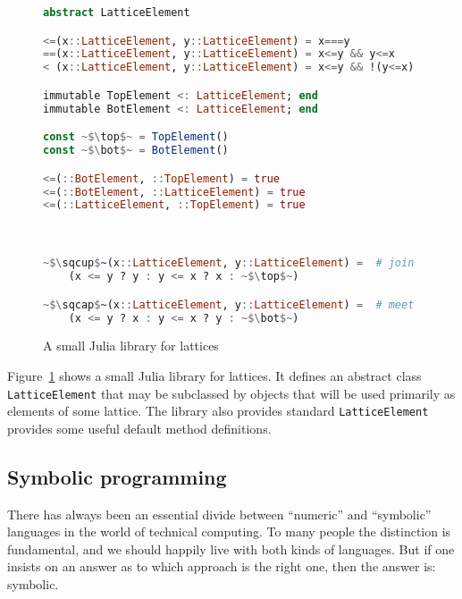 \begin{figure}
  \begin{center}
\begin{singlespace}
\begin{lstlisting}[language=julia]
abstract LatticeElement

<=(x::LatticeElement, y::LatticeElement) = x===y
==(x::LatticeElement, y::LatticeElement) = x<=y && y<=x
< (x::LatticeElement, y::LatticeElement) = x<=y && !(y<=x)

immutable TopElement <: LatticeElement; end
immutable BotElement <: LatticeElement; end

const ~$\top$~ = TopElement()
const ~$\bot$~ = BotElement()

<=(::BotElement, ::TopElement) = true
<=(::BotElement, ::LatticeElement) = true
<=(::LatticeElement, ::TopElement) = true



~$\sqcup$~(x::LatticeElement, y::LatticeElement) =  # join
    (x <= y ? y : y <= x ? x : ~$\top$~)

~$\sqcap$~(x::LatticeElement, y::LatticeElement) =  # meet
    (x <= y ? x : y <= x ? y : ~$\bot$~)
\end{lstlisting}
\end{singlespace}
  \end{center}
  \label{julialattices}
  \caption{A small Julia library for lattices}
\end{figure}





Figure~\ref{julialattices} shows a small Julia library for lattices.
It defines an abstract class \texttt{LatticeElement} that may be subclassed
by objects that will be used primarily as elements of some lattice.
The library also provides standard
\texttt{LatticeElement} provides some useful default method definitions.



\subsection{Symbolic programming}

There has always been an essential divide between ``numeric'' and ``symbolic''
languages in the world of technical computing. To many people the
distinction is fundamental, and we should happily live with both
kinds of languages. But if one insists on an answer as to which approach
is the right one, then the answer is:   symbolic.

